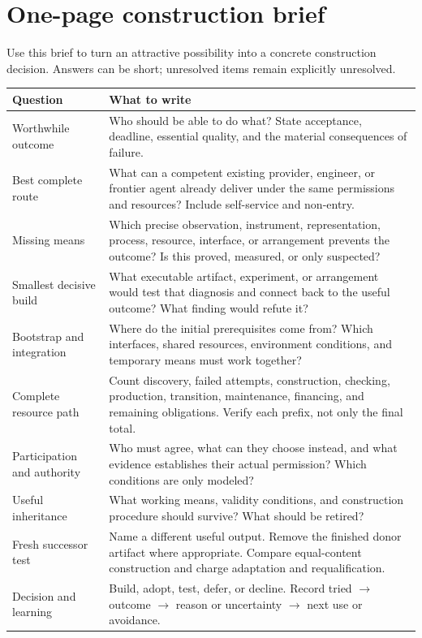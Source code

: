 \clearpage
\appendix
\section{One-page construction brief}
\label{app:brief}

Use this brief to turn an attractive possibility into a concrete construction decision. Answers can be short; unresolved items remain explicitly unresolved.

\begin{longtable}{@{}P{1.55in}P{4.95in}@{}}
\toprule
\textbf{Question} & \textbf{What to write}\\
\midrule
\endhead
Worthwhile outcome & Who should be able to do what? State acceptance, deadline, essential quality, and the material consequences of failure.\\[.4em]
Best complete route & What can a competent existing provider, engineer, or frontier agent already deliver under the same permissions and resources? Include self-service and non-entry.\\[.4em]
Missing means & Which precise observation, instrument, representation, process, resource, interface, or arrangement prevents the outcome? Is this proved, measured, or only suspected?\\[.4em]
Smallest decisive build & What executable artifact, experiment, or arrangement would test that diagnosis and connect back to the useful outcome? What finding would refute it?\\[.4em]
Bootstrap and integration & Where do the initial prerequisites come from? Which interfaces, shared resources, environment conditions, and temporary means must work together?\\[.4em]
Complete resource path & Count discovery, failed attempts, construction, checking, production, transition, maintenance, financing, and remaining obligations. Verify each prefix, not only the final total.\\[.4em]
Participation and authority & Who must agree, what can they choose instead, and what evidence establishes their actual permission? Which conditions are only modeled?\\[.4em]
Useful inheritance & What working means, validity conditions, and construction procedure should survive? What should be retired?\\[.4em]
Fresh successor test & Name a different useful output. Remove the finished donor artifact where appropriate. Compare equal-content construction and charge adaptation and requalification.\\[.4em]
Decision and learning & Build, adopt, test, defer, or decline. Record tried $\rightarrow$ outcome $\rightarrow$ reason or uncertainty $\rightarrow$ next use or avoidance.\\
\bottomrule
\end{longtable}

